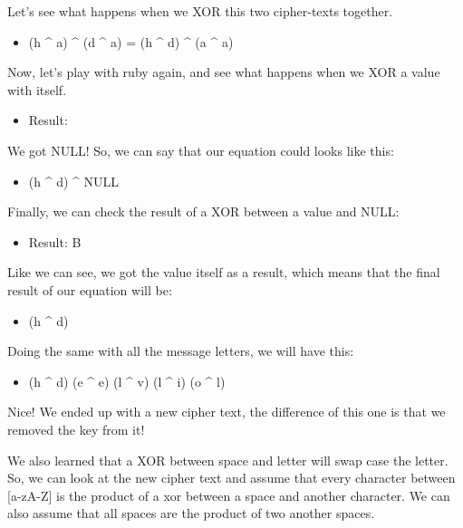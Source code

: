 \documentclass[journal]{IEEEtran}
\begin{document}
Let’s see what happens when we XOR this two cipher-texts together.

\begin{itemize}
	\item (h \textasciicircum{} a) \textasciicircum{} (d \textasciicircum{} a) = (h \textasciicircum{} d) \textasciicircum{} (a \textasciicircum{} a) 
\end{itemize}

Now, let’s play with ruby again, and see what happens when we XOR a value with itself.


\begin{itemize}
	\item Result:
\end{itemize}

We got NULL! So, we can say that our equation could looks like this:

\begin{itemize}
	\item (h \textasciicircum{} d) \textasciicircum{} NULL
\end{itemize}

Finally, we can check the result of a XOR between a value and NULL:


\begin{itemize}
	\item Result: B
\end{itemize}

Like we can see, we got the value itself as a result, which means that the final result of our equation will be:

\begin{itemize}
	\item (h \textasciicircum{} d)
\end{itemize}

Doing the same with all the message letters, we will have this:

\begin{itemize}
	\item (h \textasciicircum{} d) (e \textasciicircum{} e) (l \textasciicircum{} v) (l \textasciicircum{} i) (o \textasciicircum{} l)
\end{itemize}

Nice! We ended up with a new cipher text, the difference of this one is that we removed the key from it!

We also learned that a XOR between space and letter will swap case the letter. So, we can look at the new cipher text and assume that every character between [a-zA-Z] is the product of a xor between a space and another character. We can also assume that all spaces are the product of two another spaces. 
\end{document}
